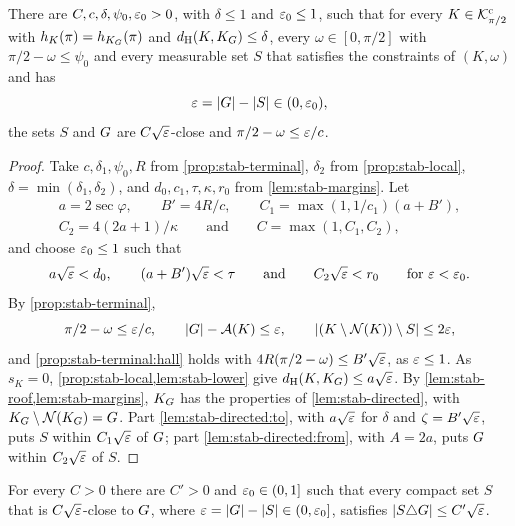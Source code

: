 \begin{proposition}\label{prop:stab-sofa}
There are $C,c,\delta,\psi_0,\varepsilon_0>0$, with $\delta\le1$ and $\varepsilon_0\le1$,
such that for every $K\in\mathcal{K}^{\mathrm{c}}_{\pi/2}$ with $h_K(\pi)=h_{K_G}(\pi)$ and
$d_{\mathrm{H}}(K,K_G)\le\delta$, every $\omega\in[0,\pi/2]$ with
$\pi/2-\omega\le\psi_0$ and every measurable set $S$ that satisfies the
constraints of $(K,\omega)$ and has
\[
  \varepsilon=\lvert G\rvert-\lvert S\rvert\in(0,\varepsilon_0),
\]
the sets $S$ and $G$ are $C\sqrt{\varepsilon}$-close and $\pi/2-\omega\le\varepsilon/c$.
\end{proposition}

\begin{proof}
Take $c,\delta_1,\psi_0,R$ from \cref{prop:stab-terminal}, $\delta_2$ from
\cref{prop:stab-local}, $\delta=\min(\delta_1,\delta_2)$, and
$d_0,c_1,\tau,\kappa,r_0$ from \cref{lem:stab-margins}. Let
\begin{gather*}
  a=2\sec\varphi,\qquad B'=4R/c,\qquad C_1=\max(1,1/c_1)(a+B'),\\
  C_2=4(2a+1)/\kappa\qquad\text{and}\qquad C=\max(1,C_1,C_2),
\end{gather*}
and choose $\varepsilon_0\le1$ such that
\[
  a\sqrt{\varepsilon}<d_0,\qquad(a+B')\sqrt{\varepsilon}<\tau\qquad\text{and}\qquad
  C_2\sqrt{\varepsilon}<r_0\qquad\text{for }\varepsilon<\varepsilon_0.
\]
By \cref{prop:stab-terminal},
\[
  \pi/2-\omega\le\varepsilon/c,\qquad\lvert G\rvert-\mathcal{A}(K)\le\varepsilon,\qquad
  \lvert (K\setminus\mathcal{N}(K))\setminus S\rvert\le2\varepsilon,
\]
and \ref{prop:stab-terminal:hall} holds with $4R(\pi/2-\omega)\le B'\sqrt{\varepsilon}$,
as $\varepsilon\le1$. As $s_K=0$, \cref{prop:stab-local,lem:stab-lower} give
$d_{\mathrm{H}}(K,K_G)\le a\sqrt{\varepsilon}$. By \cref{lem:stab-roof,lem:stab-margins}, $K_G$
has the properties of \cref{lem:stab-directed}, with
$K_G\setminus\mathcal{N}(K_G)=G$. Part \ref{lem:stab-directed:to}, with
$a\sqrt{\varepsilon}$ for $\delta$ and $\zeta=B'\sqrt{\varepsilon}$, puts $S$ within
$C_1\sqrt{\varepsilon}$ of $G$; part \ref{lem:stab-directed:from}, with $A=2a$, puts
$G$ within $C_2\sqrt{\varepsilon}$ of $S$.
\end{proof}

\begin{lemma}\label{lem:stab-symdiff}
For every $C>0$ there are $C'>0$ and $\varepsilon_0\in(0,1]$ such that every compact
set $S$ that is $C\sqrt{\varepsilon}$-close to $G$, where
$\varepsilon=\lvert G\rvert-\lvert S\rvert\in(0,\varepsilon_0]$, satisfies
$\lvert S\triangle G\rvert\le C'\sqrt{\varepsilon}$.
\end{lemma}

